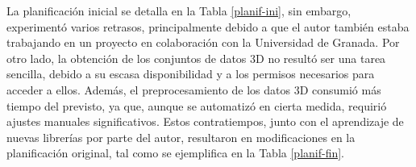 \begin{table}[H]
	\caption{Planificación inicial del proyecto.}
	\label{planif-ini}
\end{table}

La planificación inicial se detalla en la Tabla \ref{planif-ini}, sin embargo, experimentó varios retrasos, principalmente debido a que el autor también estaba trabajando en un proyecto en colaboración con la Universidad de Granada. Por otro lado, la obtención de los conjuntos de datos 3D no resultó ser una tarea sencilla, debido a su escasa disponibilidad y a los permisos necesarios para acceder a ellos. Además, el preprocesamiento de los datos 3D consumió más tiempo del previsto, ya que, aunque se automatizó en cierta medida, requirió ajustes manuales significativos. Estos contratiempos, junto con el aprendizaje de nuevas librerías por parte del autor, resultaron en modificaciones en la planificación original, tal como se ejemplifica en la Tabla \ref{planif-fin}.

